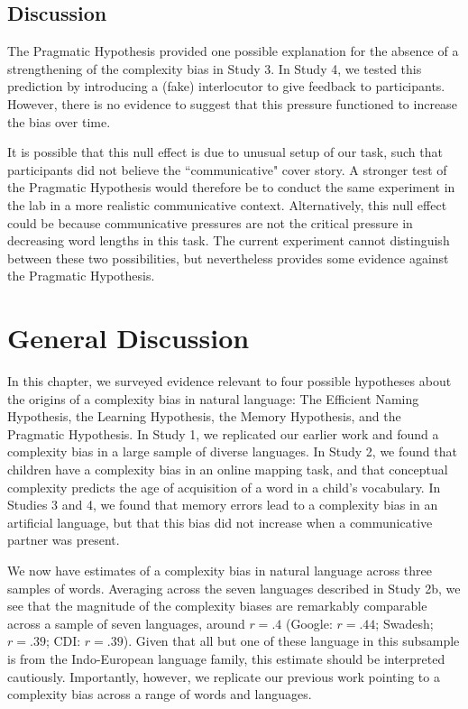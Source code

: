 \subsection{Discussion}
The Pragmatic Hypothesis provided one possible explanation for the absence of a strengthening of the complexity bias in Study 3. In Study 4, we tested this prediction by introducing a (fake) interlocutor to give feedback to participants. However, there is no evidence to suggest that this pressure functioned to  increase the bias over time.

It is possible that this null effect is due to unusual setup of our task, such that participants did not believe the ``communicative" cover story.  A stronger test of the Pragmatic Hypothesis would therefore be to conduct the same experiment in the lab in a more realistic communicative context. Alternatively, this null effect could be because communicative pressures are not the critical pressure in decreasing word lengths in this task. The current experiment cannot distinguish between these two possibilities, but nevertheless provides some evidence against the Pragmatic Hypothesis.

\section{General Discussion }
In this chapter, we surveyed evidence relevant to four possible hypotheses about the origins of a complexity bias in natural language: The Efficient Naming Hypothesis, the Learning Hypothesis, the Memory Hypothesis, and the Pragmatic Hypothesis. In Study 1, we replicated our earlier work and found a complexity bias in a large sample of diverse languages. In Study 2, we found that children have a complexity bias in an online mapping task, and that conceptual complexity predicts the age of acquisition of a word in a child's vocabulary. In Studies 3 and 4, we found that memory errors lead to a complexity bias in an artificial language, but that this bias did not increase when a communicative partner was present.

We now have estimates of a complexity bias in natural language across three samples of words. Averaging across the seven languages described in Study 2b, we see that the magnitude of the complexity biases are remarkably comparable across a sample of seven languages, around $r = .4$ (Google: $r = .44$; Swadesh; $r = .39$;  CDI: $r = .39$). Given that all but one of these language in this subsample is from the Indo-European language family, this estimate should be interpreted cautiously. Importantly, however, we replicate our previous work pointing to a complexity bias across a range of words and languages.

